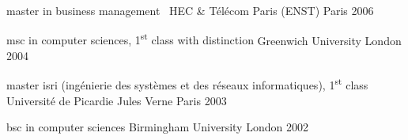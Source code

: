 


\begin{cventries}

  \cventry
    {master in business management} %
    {\, HEC \& Télécom Paris (ENST)} %
    {Paris} %
    {2006} %
    {}
    {}

  \cventry
    {msc in computer sciences, 1\textsuperscript{st} class with distinction} %
    {\hspace{0.5em}Greenwich University} %
    {London} %
    {2004} %
    {}
    {}

  \cventry
    {master isri (ingénierie des systèmes et des réseaux informatiques), 1\textsuperscript{st} class} %
    {\hspace{0.5em}Université de Picardie Jules Verne} %
    {Paris} %
    {2003} %
    {}
    {}

  \cventry
    {bsc in computer sciences} %
    {\hspace{0.5em}Birmingham University} %
    {London} %
    {2002} %
    {}
    {}
\end{cventries}
